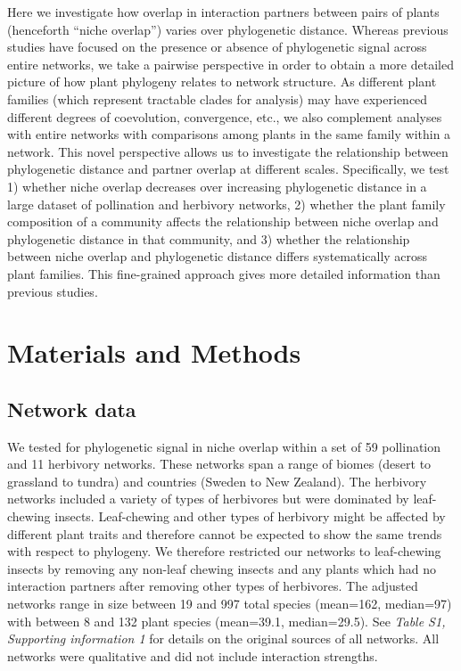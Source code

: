 \documentclass[12pt]{article}
\begin{document}
\begin{spacing}{1.5}
  Here we investigate how overlap in interaction partners between 
  pairs of plants (henceforth ``niche overlap'') varies over 
  phylogenetic distance. 
  Whereas previous 
  studies have focused on the presence or absence of phylogenetic
  signal across entire networks, we take a pairwise perspective in
  order to obtain a more detailed picture of how plant phylogeny
  relates to network structure. As different plant families (which represent tractable clades for analysis) may have experienced different degrees of coevolution, convergence, etc., we also complement analyses with entire networks with comparisons among plants in the same family within a network. 
  This novel perspective allows us to investigate the relationship between phylogenetic distance and partner overlap at different scales. 
  Specifically,
  we test 1) whether niche overlap decreases over increasing phylogenetic
  distance in a large dataset of pollination and herbivory networks, 
  2) whether the plant family composition of a community affects the
  relationship between niche overlap and phylogenetic distance in that 
  community, and 3) whether the relationship between niche overlap and 
  phylogenetic distance differs systematically across plant families. 
  This fine-grained approach gives more detailed information than previous studies. 

\clearpage

\section*{Materials and Methods} 

  \subsection*{Network data}

    We tested for phylogenetic signal in niche overlap within a 
    set of 59 pollination and 11 herbivory networks. These networks span 
    a range of biomes (desert to grassland to tundra) and 
    countries (Sweden to New Zealand). The herbivory networks included a 
    variety of types of herbivores but were dominated by leaf-chewing insects. 
    Leaf-chewing and other types of herbivory might be affected by different
    plant traits and therefore cannot be expected to show the same trends
    with respect to phylogeny. We therefore restricted our networks to
    leaf-chewing insects by removing any non-leaf chewing insects and any 
    plants which had no interaction partners after removing other types  
    of herbivores.
    The adjusted networks range in size between 19 and 
    997 total species (mean=162, median=97) with between 8 and 132 
    plant species (mean=39.1, median=29.5). See \emph{Table S1, 
    Supporting information 1} for details on the original sources of all 
    networks. All networks were qualitative and did not include interaction strengths.



\end{spacing}
\end{document}
